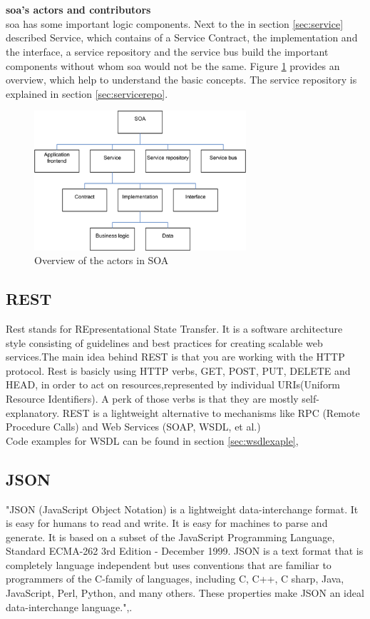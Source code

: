 \documentclass[12pt]{article}
\begin{document}
\\ \\
\textbf{\gls{soa}'s actors and contributors}\\
\gls{soa} has some important logic components. Next to the in section \ref{sec:service} described Service, which contains of a Service Contract, the implementation and the interface, a service repository and the service bus build the important components without whom \gls{soa} would not be the same. Figure \ref{fig:actorsSoa} provides an overview, which help to understand the basic concepts. The service repository is explained in section \ref{sec:servicerepo}.
	\begin{figure}[here!]
	\centering
	\includegraphics[width=0.7\textwidth]{images/arg2}
	\caption{Overview of the actors in SOA \cite{arg2}}
	\label{fig:actorsSoa}
	\end{figure}
	\FloatBarrier
\subsection{REST}
Rest stands for REpresentational State Transfer. It is a software architecture style consisting of guidelines and best practices 
for creating scalable web services.The main idea behind REST is that you are working with the HTTP protocol. Rest is basicly using HTTP verbs, GET, POST, PUT, DELETE and HEAD, in order to act on resources,represented by individual URIs(Uniform Resource Identifiers). 
A perk of those verbs is that they are mostly self-explanatory. REST is a lightweight alternative to mechanisms like RPC (Remote Procedure Calls) and Web Services (SOAP, WSDL, et al.)\\
Code examples for WSDL can be found in section \ref{sec:wsdlexaple}, 
\subsection{JSON}
"JSON (JavaScript Object Notation) is a lightweight data-interchange format. It is easy for humans to read and write. It is easy for machines to parse and generate. It is based on a subset of the JavaScript Programming Language, Standard ECMA-262 3rd Edition - December 1999. JSON is a text format that is completely language independent but uses conventions that are familiar to programmers of the C-family of languages, including C, C++, C sharp, Java, JavaScript, Perl, Python, and many others. These properties make JSON an ideal data-interchange language.",\cite{json}.
\end{document}
